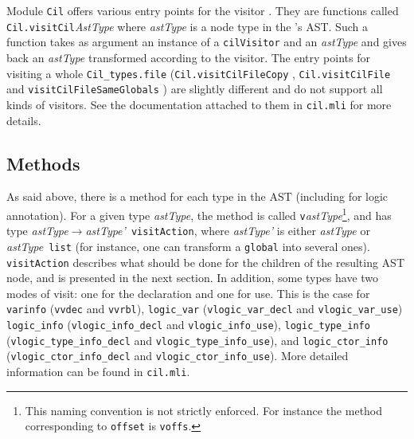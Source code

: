 Module \texttt{Cil} offers various entry points for the visitor%
. They are functions called
\verb+Cil.visitCil+\emph{AstType} where
\emph{astType} is a node type in the \cil's AST. Such a function takes as
argument an instance of a \verb+cilVisitor+ and an
\emph{astType} and gives back an \emph{astType} transformed according to the
visitor. The entry points for visiting a whole
\verb+Cil_types.file+ (\verb+Cil.visitCilFileCopy+%
, \verb+Cil.visitCilFile+%
 and \verb+visitCilFileSameGlobals+%
) are slightly different and do not
support all kinds of visitors.  See the documentation attached to them in
\verb+cil.mli+ for more details.

\subsection{Methods}\label{adv:sec:methods}

As said above, there is a method for each type in the \cil AST
(including for logic annotation). For a given type
\emph{astType}, the method is called \texttt{v}\emph{astType}\footnote{This
  naming convention is not strictly enforced. For instance the method
  corresponding to \texttt{offset} is
  \texttt{voffs}.}, and has type
\mbox{\emph{astType}$\rightarrow$\emph{astType'}~\texttt{visitAction}}, where
\emph{astType'} is either \emph{astType} or \emph{astType}~\texttt{list} (for
instance, one can transform a \verb+global+ into
several ones). \texttt{visitAction} describes
what should be done for the children of the resulting AST node, and is
presented in the next section. In addition, some types have two modes
of visit: one for the declaration and one for use. This is the case for
\verb+varinfo+
(\verb+vvdec+ and
\verb+vvrbl+),
\verb+logic_var+
(\verb+vlogic_var_decl+ and
\verb+vlogic_var_use+)
\verb+logic_info+
(\verb+vlogic_info_decl+ and
\verb+vlogic_info_use+),
\verb+logic_type_info+
(\verb+vlogic_type_info_decl+ and
\verb+vlogic_type_info_use+), and
\verb+logic_ctor_info+
(\verb+vlogic_ctor_info_decl+ and
\verb+vlogic_ctor_info_use+).
More detailed information can be found in \verb+cil.mli+.

